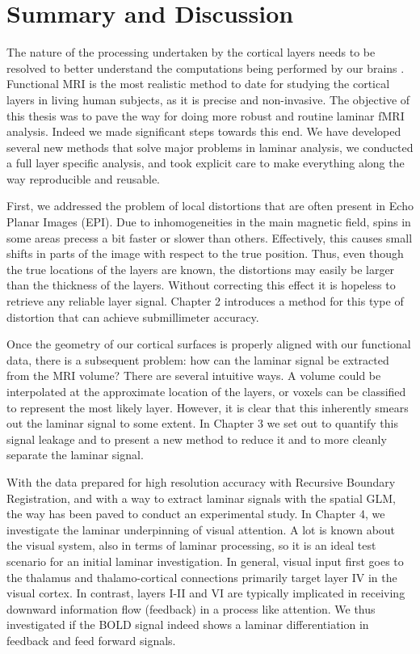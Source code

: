 
\chapter{Summary and Discussion}
\label{ch:discussion}

The nature of the processing undertaken by the cortical layers needs to be resolved to better understand the computations being performed by our brains \cite{Miller2001}. Functional MRI is the most realistic method to date for studying the cortical layers in living human subjects, as it is precise and non-invasive. The objective of this thesis was to pave the way for doing more robust and routine laminar fMRI analysis. Indeed we made significant steps towards this end. We have developed several new methods that solve major problems in laminar analysis, we conducted a full layer specific analysis, and took explicit care to make everything along the way reproducible and reusable.

First, we addressed the problem of local distortions that are often present in Echo Planar Images (EPI). Due to inhomogeneities in the main magnetic field, spins in some areas precess a bit faster or slower than others. Effectively, this causes small shifts in parts of the image with respect to the true position. Thus, even though the true locations of the layers are known, the distortions may easily be larger than the thickness of the layers. Without correcting this effect it is hopeless to retrieve any reliable layer signal. Chapter 2 introduces a method for this type of distortion that can achieve submillimeter accuracy.

Once the geometry of our cortical surfaces is properly aligned with our functional data, there is a subsequent problem: how can the laminar signal be extracted from the MRI volume? There are several intuitive ways. A volume could be interpolated at the approximate location of the layers, or voxels can be classified to represent the most likely layer. However, it is clear that this inherently smears out the laminar signal to some extent. In Chapter 3 we set out to quantify this signal leakage and to present a new method to reduce it and to more cleanly separate the laminar signal.

With the data prepared for high resolution accuracy with Recursive Boundary Registration, and with a way to extract laminar signals with the spatial GLM, the way has been paved to conduct an experimental study. In Chapter 4, we investigate the laminar underpinning of visual attention. A lot is known about the visual system, also in terms of laminar processing, so it is an ideal test scenario for an initial laminar investigation. In general, visual input first goes to the thalamus and thalamo-cortical connections primarily target layer IV in the visual cortex. In contrast, layers I-II and VI are typically implicated in receiving downward information flow (feedback) in a process like attention. We thus investigated if the BOLD signal indeed shows a laminar differentiation in feedback and feed forward signals. 

